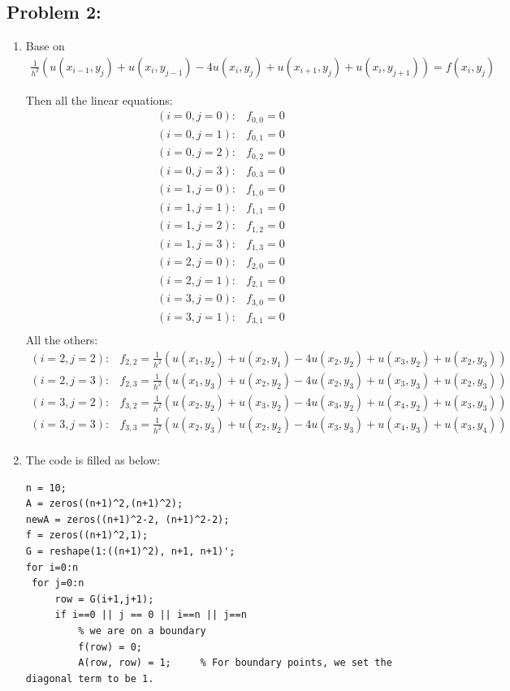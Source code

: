 \documentclass{article}
\begin{document}
\hypertarget{}{}
\subsection*{{Problem 2:}}
\label{}
\begin{enumerate}
\item 
Base on \begin{align*}  \frac{1}{h^2}(u(x_{i-1}, y_j) + u(x_i,y_{j-1})-4u(x_i,y_j)+u(x_{i+1},y_j)+u(x_i,y_{j+1}))=f(x_i,y_j)    \end{align*}

Then all the linear equations: 
\begin{align*}
(i=0, j=0): & f_{0,0} =0\\
(i=0, j=1): & f_{0,1} =0\\
(i=0, j=2): & f_{0,2} =0\\
(i=0, j=3): & f_{0,3} =0\\
(i=1, j=0): & f_{1,0} =0\\
(i=1, j=1): & f_{1,1} =0\\
(i=1, j=2): & f_{1,2} =0\\
(i=1, j=3): & f_{1,3} =0\\
(i=2, j=0): & f_{2,0} =0\\
(i=2, j=1): & f_{2,1} =0\\
(i=3, j=0): & f_{3,0} =0\\
(i=3, j=1): & f_{3,1} =0\\
\end{align*} 
All the others:  \begin{align*}
(i=2, j=2): & f_{2,2} =\frac{1}{h^2}(u(x_{1}, y_2) + u(x_2,y_{1})-4u(x_2,y_2)+u(x_{3},y_2)+u(x_2,y_{3}))\\
(i=2, j=3): & f_{2,3} =\frac{1}{h^2}(u(x_{1}, y_3) + u(x_2,y_{2})-4u(x_2,y_3)+u(x_{3},y_3)+u(x_2,y_{3}))\\
(i=3, j=2): & f_{3,2} =\frac{1}{h^2}(u(x_{2}, y_2) + u(x_3,y_{2})-4u(x_3,y_2)+u(x_{4},y_2)+u(x_3,y_{3})) \\
(i=3, j=3): & f_{3,3} =\frac{1}{h^2}(u(x_{2}, y_3) + u(x_2,y_{2})-4u(x_3,y_3)+u(x_{4},y_3)+u(x_3,y_{4})) \\
\end{align*} 
\item 
The code is filled as below: 
\begin{lstlisting}
n = 10;
A = zeros((n+1)^2,(n+1)^2);
newA = zeros((n+1)^2-2, (n+1)^2-2); 
f = zeros((n+1)^2,1);
G = reshape(1:((n+1)^2), n+1, n+1)'; 
for i=0:n
 for j=0:n
     row = G(i+1,j+1);
     if i==0 || j == 0 || i==n || j==n
         % we are on a boundary
         f(row) = 0;
         A(row, row) = 1;     % For boundary points, we set the diagonal term to be 1. 
        

\end{lstlisting}
\end{enumerate}
\end{document}
